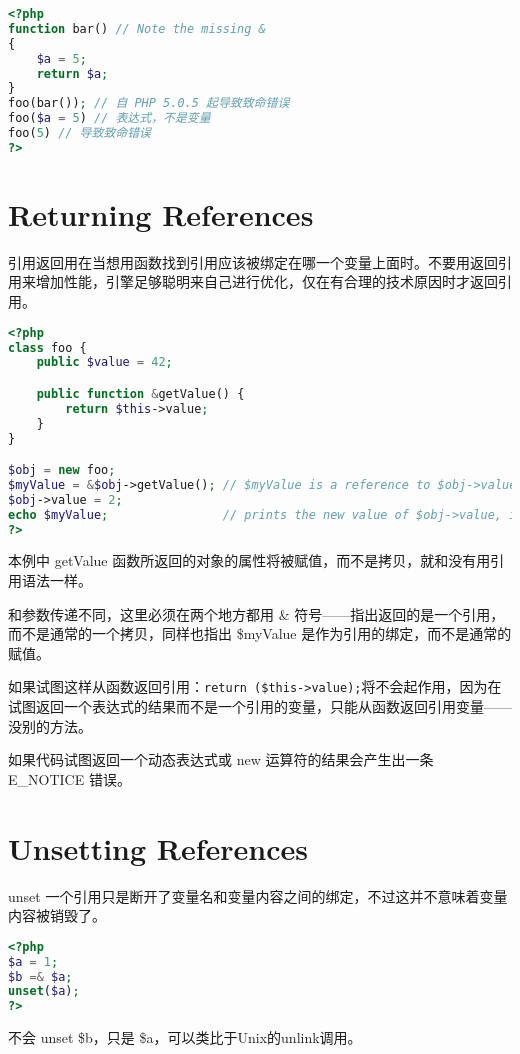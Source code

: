 \begin{lstlisting}[language=PHP]
<?php
function bar() // Note the missing &
{
    $a = 5;
    return $a;
}
foo(bar()); // 自 PHP 5.0.5 起导致致命错误
foo($a = 5) // 表达式，不是变量
foo(5) // 导致致命错误
?>
\end{lstlisting}

\chapter{Returning References}


引用返回用在当想用函数找到引用应该被绑定在哪一个变量上面时。不要用返回引用来增加性能，引擎足够聪明来自己进行优化，仅在有合理的技术原因时才返回引用。

\begin{lstlisting}[language=PHP]
<?php
class foo {
    public $value = 42;

    public function &getValue() {
        return $this->value;
    }
}

$obj = new foo;
$myValue = &$obj->getValue(); // $myValue is a reference to $obj->value, which is 42.
$obj->value = 2;
echo $myValue;                // prints the new value of $obj->value, i.e. 2.
?>
\end{lstlisting}

本例中 getValue 函数所返回的对象的属性将被赋值，而不是拷贝，就和没有用引用语法一样。

和参数传递不同，这里必须在两个地方都用 \& 符号——指出返回的是一个引用，而不是通常的一个拷贝，同样也指出 \$myValue 是作为引用的绑定，而不是通常的赋值。

如果试图这样从函数返回引用：\texttt{return (\$this->value);}将不会起作用，因为在试图返回一个表达式的结果而不是一个引用的变量，只能从函数返回引用变量——没别的方法。

如果代码试图返回一个动态表达式或 new 运算符的结果会产生出一条 E\_NOTICE 错误。


\chapter{Unsetting References}

unset 一个引用只是断开了变量名和变量内容之间的绑定，不过这并不意味着变量内容被销毁了。


\begin{lstlisting}[language=PHP]
<?php
$a = 1;
$b =& $a;
unset($a);
?>
\end{lstlisting}

不会 unset \$b，只是 \$a，可以类比于Unix的unlink调用。

